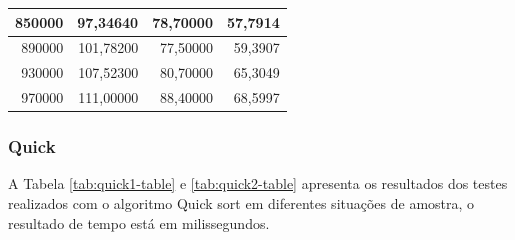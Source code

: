\documentclass[a4paper, 12pt]{article}
\begin{document}
\begin{longtable}[c]{@{}rrrr@{}}
		\multicolumn{1}{|r|}{850000}                  & \multicolumn{1}{r|}{97,34640}               & \multicolumn{1}{r|}{78,70000}                                                          & \multicolumn{1}{r|}{57,7914}                                                           \\* \midrule
		\multicolumn{1}{|r|}{890000}                  & \multicolumn{1}{r|}{101,78200}              & \multicolumn{1}{r|}{77,50000}                                                          & \multicolumn{1}{r|}{59,3907}                                                           \\* \midrule
		\multicolumn{1}{|r|}{930000}                  & \multicolumn{1}{r|}{107,52300}              & \multicolumn{1}{r|}{80,70000}                                                          & \multicolumn{1}{r|}{65,3049}                                                           \\* \midrule
		\multicolumn{1}{|r|}{970000}                  & \multicolumn{1}{r|}{111,00000}              & \multicolumn{1}{r|}{88,40000}                                                          & \multicolumn{1}{r|}{68,5997}                                                           \\* \bottomrule
	\end{longtable}
		
		
		

		
		\subsubsection{Quick}
		A Tabela \ref{tab:quick1-table} e \ref{tab:quick2-table}  apresenta os resultados dos testes realizados com o algoritmo Quick sort em diferentes situações de amostra, o resultado de tempo está em milissegundos.
		
\end{document}
